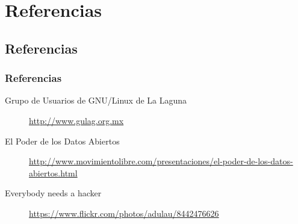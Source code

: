 %
%

\section{Referencias}

\subsection{Referencias}
\begin{frame}
    \frametitle{Referencias}
    \begin{scriptsize}
        \begin{description}
            \item [Grupo de Usuarios de GNU/Linux de La Laguna] \url{http://www.gulag.org.mx}
            \item [El Poder de los Datos Abiertos] \url{http://www.movimientolibre.com/presentaciones/el-poder-de-los-datos-abiertos.html}
            \item [Everybody needs a hacker] \url{https://www.flickr.com/photos/adulau/8442476626}
        \end{description}
    \end{scriptsize}
\end{frame}

